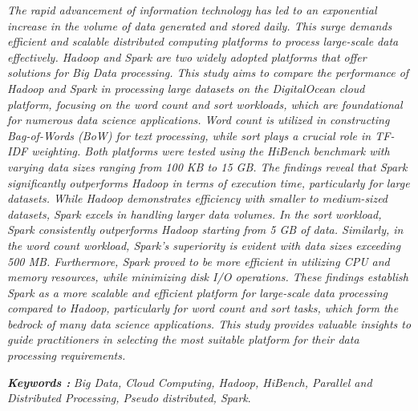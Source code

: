 \begin{abstracteng}
\justifying
\emph{
The rapid advancement of information technology has led to an exponential increase in the volume of data generated and stored daily. This surge demands efficient and scalable distributed computing platforms to process large-scale data effectively. Hadoop and Spark are two widely adopted platforms that offer solutions for Big Data processing. This study aims to compare the performance of Hadoop and Spark in processing large datasets on the DigitalOcean cloud platform, focusing on the word count and sort workloads, which are foundational for numerous data science applications. Word count is utilized in constructing Bag-of-Words (BoW) for text processing, while sort plays a crucial role in TF-IDF weighting. Both platforms were tested using the HiBench benchmark with varying data sizes ranging from 100 KB to 15 GB. The findings reveal that Spark significantly outperforms Hadoop in terms of execution time, particularly for large datasets. While Hadoop demonstrates efficiency with smaller to medium-sized datasets, Spark excels in handling larger data volumes. In the sort workload, Spark consistently outperforms Hadoop starting from 5 GB of data. Similarly, in the word count workload, Spark's superiority is evident with data sizes exceeding 500 MB. Furthermore, Spark proved to be more efficient in utilizing CPU and memory resources, while minimizing disk I/O operations. These findings establish Spark as a more scalable and efficient platform for large-scale data processing compared to Hadoop, particularly for word count and sort tasks, which form the bedrock of many data science applications. This study provides valuable insights to guide practitioners in selecting the most suitable platform for their data processing requirements.}

\bigskip
\noindent
\textbf{\emph{Keywords :}} \emph{Big Data, Cloud Computing, Hadoop, HiBench, Parallel and Distributed Processing, Pseudo distributed, Spark}.
\end{abstracteng}
